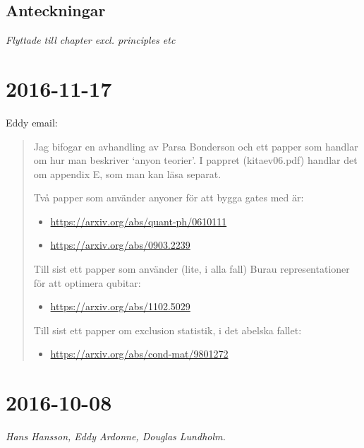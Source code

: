 \documentclass[a4paper,10pt,oneside]{book}
\theoremstyle{plain}
\theoremstyle{definition}
\theoremstyle{remark}
\begin{document}
{\subsection{Anteckningar}

\emph{Flyttade till chapter excl. principles etc}


\section{2016-11-17}

Eddy email:
\begin{quote}
  Jag bifogar en avhandling av Parsa Bonderson och ett papper
  som handlar om hur man beskriver `anyon teorier'. I pappret (kitaev06.pdf)
  handlar det om appendix E, som man kan läsa separat.

  Två papper som använder anyoner för att bygga gates med är:
  \begin{itemize}
    \item \url{https://arxiv.org/abs/quant-ph/0610111}
    \item \url{https://arxiv.org/abs/0903.2239}
  \end{itemize}

  Till sist ett papper som använder (lite, i alla fall) Burau representationer
  för att optimera qubitar:
  \begin{itemize}
    \item \url{https://arxiv.org/abs/1102.5029}
  \end{itemize}

  Till sist ett papper om exclusion statistik, i det abelska fallet:
  \begin{itemize}
    \item \url{https://arxiv.org/abs/cond-mat/9801272}
  \end{itemize}
\end{quote}




\section{2016-10-08}

\emph{Hans Hansson, Eddy Ardonne, Douglas Lundholm.}

}
\end{document}
